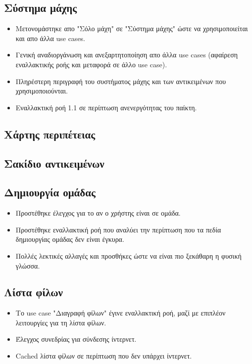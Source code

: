 \subsection{Σύστημα μάχης}
\begin{itemize}
    \item Μετονομάστηκε απο "Σόλο μάχη" σε "Σύστημα μάχης" ώστε να χρησιμοποιείται και απο άλλα use cases.
    \item Γενική αναδιοργάνωση και ανεξαρτητοποίηση απο άλλα use cases (αφαίρεση εναλλακτικής ροής και μεταφορά σε άλλο use case).
    \item Πληρέστερη περιγραφή του συστήματος μάχης και των αντικειμένων που χρησιμοποιούνται.
    \item Εναλλακτική ροή 1.1 σε περίπτωση ανενεργότητας του παίκτη.
\end{itemize}
\subsection{Χάρτης περιπέτειας}
\subsection{Σακίδιο αντικειμένων}
\subsection{Δημιουργία ομάδας}
\begin{itemize}
    \item Προστέθηκε έλεγχος για το αν ο χρήστης είναι σε ομάδα.
    \item Προστέθηκε εναλλακτική ροή που αναλύει την περίπτωση που τα πεδία δημιουργίας ομάδας δεν είναι έγκυρα.
    \item Πολλές λεκτικές αλλαγές και προσθήκες ώστε να είναι πιο ξεκάθαρη η φυσική γλώσσα.
\end{itemize}
\subsection{Λίστα φίλων}
\begin{itemize}
    \item Το use case "Διαγραφή φίλων" έγινε εναλλακτική ροή, μαζί με επιπλέον λειτουργίες για τη λίστα φίλων.
    \item Έλεγχος συνεδρίας για σύνδεσης ίντερνετ.
    \item Cached λίστα φίλων σε περίπτωση που δεν υπάρχει ίντερνετ.
\end{itemize}


\clearpage